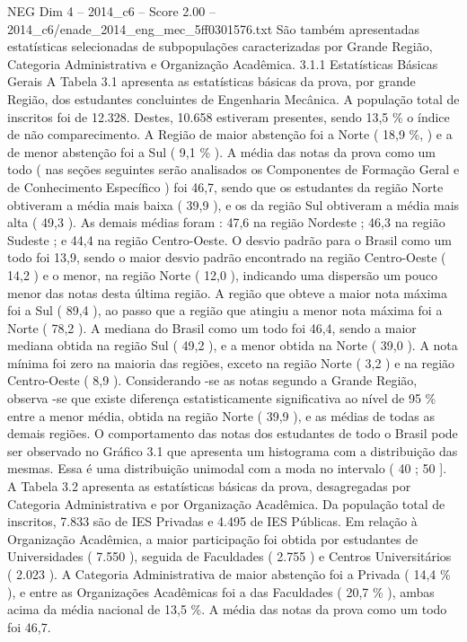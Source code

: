 \begin{textsample}{NEG Dim 4 – 2014\_c6 – Score 2.00 – 2014\_c6/enade\_2014\_eng\_mec\_5ff0301576.txt}
São também apresentadas estatísticas selecionadas de subpopulações caracterizadas por Grande Região, Categoria Administrativa e Organização Acadêmica. 3.1.1 Estatísticas Básicas Gerais A Tabela 3.1 apresenta as estatísticas básicas da prova, por grande Região, dos estudantes concluintes de Engenharia Mecânica.
A população total de inscritos foi de 12.328.
Destes, 10.658 estiveram presentes, sendo 13,5 \% o índice de não comparecimento.
A Região de maior abstenção foi a Norte ( 18,9 \%, ) e a de menor abstenção foi a Sul ( 9,1 \% ).
A média das notas da prova como um todo ( nas seções seguintes serão analisados os Componentes de Formação Geral e de Conhecimento Específico ) foi 46,7, sendo que os estudantes da região Norte obtiveram a média mais baixa ( 39,9 ), e os da região Sul obtiveram a média mais alta ( 49,3 ).
As demais médias foram : 47,6 na região Nordeste ; 46,3 na região Sudeste ; e 44,4 na região Centro-Oeste.
O desvio padrão para o Brasil como um todo foi 13,9, sendo o maior desvio padrão encontrado na região Centro-Oeste ( 14,2 ) e o menor, na região Norte ( 12,0 ), indicando uma dispersão um pouco menor das notas desta última região.
A região que obteve a maior nota máxima foi a Sul ( 89,4 ), ao passo que a região que atingiu a menor nota máxima foi a Norte ( 78,2 ).
A mediana do Brasil como um todo foi 46,4, sendo a maior mediana obtida na região Sul ( 49,2 ), e a menor obtida na Norte ( 39,0 ).
A nota mínima foi zero na maioria das regiões, exceto na região Norte ( 3,2 ) e na região Centro-Oeste ( 8,9 ).
Considerando -se as notas segundo a Grande Região, observa -se que existe diferença estatisticamente significativa ao nível de 95 \% entre a menor média, obtida na região Norte ( 39,9 ), e as médias de todas as demais regiões.
O comportamento das notas dos estudantes de todo o Brasil pode ser observado no Gráfico 3.1 que apresenta um histograma com a distribuição das mesmas.
Essa é uma distribuição unimodal com a moda no intervalo ( 40 ; 50 ].
A Tabela 3.2 apresenta as estatísticas básicas da prova, desagregadas por Categoria Administrativa e por Organização Acadêmica.
Da população total de inscritos, 7.833 são de IES Privadas e 4.495 de IES Públicas.
Em relação à Organização Acadêmica, a maior participação foi obtida por estudantes de Universidades ( 7.550 ), seguida de Faculdades ( 2.755 ) e Centros Universitários ( 2.023 ).
A Categoria Administrativa de maior abstenção foi a Privada ( 14,4 \% ), e entre as Organizações Acadêmicas foi a das Faculdades ( 20,7 \% ), ambas acima da média nacional de 13,5 \%.
A média das notas da prova como um todo foi 46,7.

\end{textsample}
